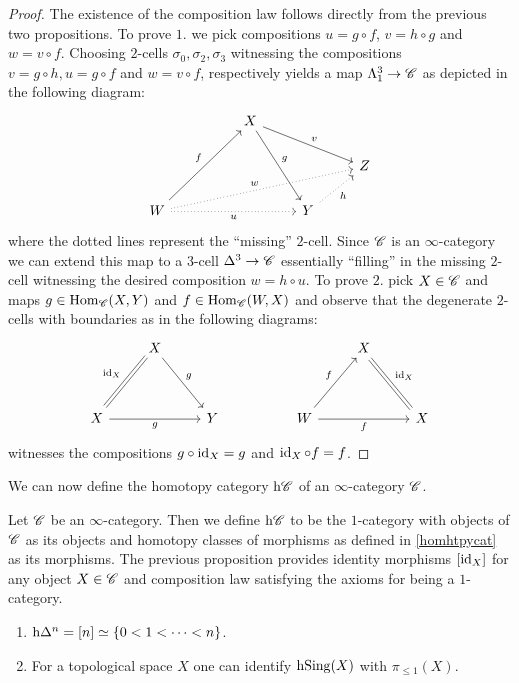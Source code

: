 \documentclass[../../thesis.tex]{subfiles}
\begin{document}
\begin{proof}
    The existence of the composition law follows directly from the previous two propositions.
    To prove $1.$ we pick compositions $u = g\circ f$, $v = h\circ g$ and $w = v\circ f$.
    Choosing $2$-cells $\sigma_0, \sigma_2, \sigma_3$ witnessing the compositions $v = g\circ h, u = g\circ f$ and $w = v \circ f$, respectively yields a map $\Lambda_1^3 \to \mathscr{C}$ as depicted in the following diagram:
    \[\begin{tikzcd}
            && X \\
            &&&& Z \\
            W &&& Y
            \arrow["w", dotted, from=3-1, to=2-5]
            \arrow["f", from=3-1, to=1-3]
            \arrow["v",from=1-3, to=2-5]
            \arrow["h"', dotted, from=3-4, to=2-5]
            \arrow["g", from=1-3, to=3-4]
            \arrow["u"', dotted, from=3-1, to=3-4]
        \end{tikzcd}\]
    where the dotted lines represent the ``missing'' $2$-cell.
    Since $\mathscr{C}$ is an $\infty$-category we can extend this map to a $3$-cell $\Delta^3 \to \mathscr{C}$ essentially ``filling'' in the missing $2$-cell witnessing the desired composition $w = h \circ u$.
    \newline
    To prove $2.$ pick $X\in \mathscr{C}$ and maps $g \in \mathrm{Hom}_{\mathscr{C}}(X,Y)$ and $f \in \mathrm{Hom}_{\mathscr{C}}(W,X)$ and observe that the degenerate $2$-cells with boundaries as in the following diagrams:
    \[\begin{tikzcd}
            & X &&&& X \\
            \\
            X && Y && W && X
            \arrow["g"', from=3-1, to=3-3]
            \arrow["g", from=1-2, to=3-3]
            \arrow[no head, from=3-1, to=1-2]
            \arrow["{\id_X}"', shift right=1, no head, from=1-2, to=3-1]
            \arrow["f", from=3-5, to=1-6]
            \arrow["f"', from=3-5, to=3-7]
            \arrow[shift right=1, no head, from=1-6, to=3-7]
            \arrow["{\id_X}"', no head, from=3-7, to=1-6]
        \end{tikzcd}\]
    witnesses the compositions $g \circ \operatorname{id}_X = g$ and $\operatorname{id}_X \circ f = f$.
\end{proof}
We can now define the homotopy category $\mathrm{h}\mathscr{C}$ of an $\infty$-category $\mathscr{C}$.
\begin{definition}
    Let $\mathscr{C}$ be an $\infty$-category.
    Then we define $\mathrm{h}\mathscr{C}$ to be the $1$-category with objects of $\mathscr{C}$ as its objects and homotopy classes of morphisms as defined in \ref{homhtpycat} as its morphisms.
    The previous proposition provides identity morphisms $[\operatorname{id}_X]$ for any object $X\in \mathscr{C}$ and composition law satisfying the axioms for being a $1$-category.
\end{definition}
\begin{example}\phantom{a}
    \begin{enumerate}
        \item $\mathrm{h}\Delta^n = [n] \simeq \{0 < 1 < \cdots < n\}$.
        \item For a topological space $X$ one can identify $\mathrm{h}\mathrm{Sing}(X)$ with $\pi_{\leq 1}(X)$.
    \end{enumerate}
\end{example}
\end{document}
